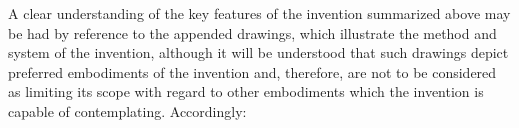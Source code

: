

A clear understanding of the key features of the invention summarized above may be had 
by reference to the appended drawings, which illustrate the method and system of the 
invention, although it will be understood that such drawings depict preferred 
embodiments of the invention and, therefore, are not to be considered as limiting its 
scope with regard to other embodiments which the invention is capable of contemplating. 
Accordingly:




